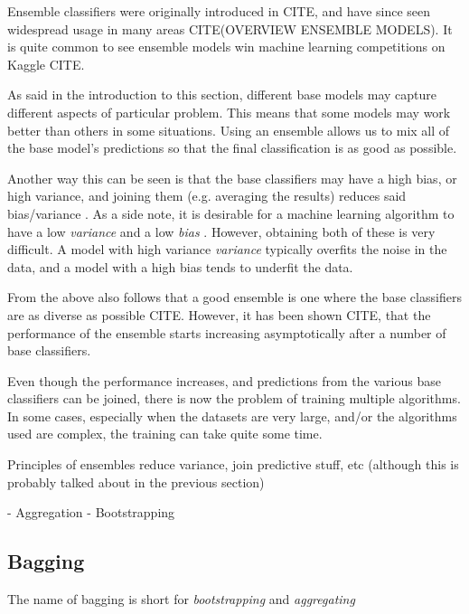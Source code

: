 \documentclass[epsfig,a4paper,11pt,titlepage,twoside,openany]{book}
\begin{document}
Ensemble classifiers were originally introduced in CITE, and have since seen widespread usage in many areas CITE(OVERVIEW ENSEMBLE MODELS). It is quite common to see ensemble models win machine learning competitions on Kaggle CITE. 

As said in the introduction to this section, different base models may capture different aspects of particular problem. This means that some models may work better than others in some situations. Using an ensemble allows us to mix all of the base model's predictions so that the final classification is as good as possible. 

Another way this can be seen is that the base classifiers may have a high bias, or high variance, and joining them (e.g. averaging the results) reduces said bias/variance \cite{Breiman1996_bagging_predictors}. As a side note, it is desirable for a machine learning algorithm to have a low \textit{variance} and a low \textit{bias} \cite{Munro2011_bias_variance_decomp}. However, obtaining both of these is very difficult. A model with high variance \textit{variance} typically overfits the noise in the data, and a model with a high bias tends to underfit the data. 

From the above also follows that a good ensemble is one where the base classifiers are as diverse as possible CITE. However, it has been shown CITE, that the performance of the ensemble starts increasing asymptotically after a number of base classifiers. 


Even though the performance increases, and predictions from the various base classifiers can be joined, there is now the problem of training multiple algorithms. In some cases, especially when the datasets are very large, and/or the algorithms used are complex, the training can take quite some time.



Principles of ensembles reduce variance, join predictive stuff, etc (although
this is probably talked about in the previous section)

- Aggregation - Bootstrapping
     
\subsection{Bagging}
\label{sec:ens-bagging}

The name of bagging is short for \textit{bootstrapping} and \textit{aggregating}
\end{document}
